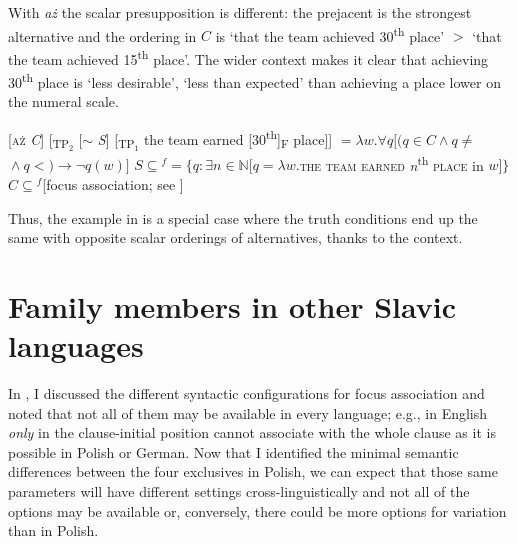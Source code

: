 \documentclass[output=paper,colorlinks,citecolor=brown]{langscibook}
\begin{document}
\noindent With \textit{aż} the scalar presupposition is different: the prejacent is the strongest alternative and the ordering in $C$ is  ‘that the team achieved 30\textsuperscript{th} place’ $>$ ‘that the team achieved 15\textsuperscript{th} place’. The wider context makes it clear that achieving 30\textsuperscript{th} place is ‘less desirable’, ‘less than expected’ than achieving a place lower on the numeral scale.


\ea\label{ex:tom:89}
\ea\label{ex:tom:89a} 
{}[\textsc{aż} \textit{C}] [\textsubscript{TP$_2$} [$\sim$ \textit{S}] [\textsubscript{TP$_1$} the team earned [30\textsuperscript{th}]\textsubscript{F} place]]
\ex\label{ex:tom:89b}
${} = λw.\forall q [(q\in C\wedge q\neq{}$${}\wedge q <{}$$) → ¬q(w)]$
\ex\label{ex:tom:89c}      
$S\subseteq{}$$^f = \{q:\exists n\in ℕ [q = λw.{}$\textsc{the team earned} \textit{n}\textsuperscript{th} \textsc{place} in $w]\}$
\ex\label{ex:tom:89d} 
$C\subseteq{}$$^f$\hfill [focus association; see ]
\z\z 

\noindent Thus, the example in  is a special case where the truth conditions end up the same with opposite scalar orderings of alternatives, thanks to the context.

\section{Family members in other Slavic languages}
\label{sec:tom:6}

In , I discussed the different syntactic configurations for focus association and noted that not all of them may be available in every language; e.g., in English \textit{only} in the clause-initial position cannot associate with the whole clause as it is possible in Polish or German. Now that I identified the minimal semantic differences between the four exclusives in Polish, we can expect that those same parameters will have different settings cross-linguistically and not all of the options may be available or, conversely, there could be more options for variation than in Polish. 
\end{document}
